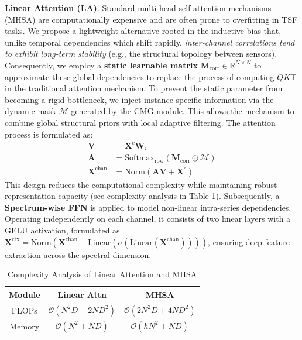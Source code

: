 \documentclass[final,3p,times]{elsarticle}
\begin{document}
\textbf{Linear Attention (LA)}. Standard multi-head self-attention mechanisms (MHSA) are computationally expensive and are often prone to overfitting in TSF tasks. We propose a lightweight alternative rooted in the inductive bias that, unlike temporal dependencies which shift rapidly, \textit{inter-channel correlations tend to exhibit long-term stability} (e.g., the structural topology between sensors). Consequently, we employ a \textbf{static learnable matrix} $\mathbf{M}_{\text{corr}} \in \mathbb{R}^{N \times N}$ to approximate these global dependencies to replace the process of computing $QK\top$ in the traditional attention mechanism.
To prevent the static parameter from becoming a rigid bottleneck, we inject instance-specific information via the dynamic mask $\mathcal{M}$ generated by the CMG module. This allows the mechanism to combine global structural priors with local adaptive filtering. The attention process is formulated as:
\begin{equation}
\begin{aligned}
    \mathbf{V} &= \mathbf{X}^c \mathbf{W}_v \\
    \mathbf{A} &= \text{Softmax}_{\text{row}}(\mathbf{M}_{\text{corr}} \odot \mathcal{M}) \\
    \mathbf{X}^{\text{chan}} &= \text{Norm}(\mathbf{A} \mathbf{V} + \mathbf{X}^c)
\end{aligned}
\end{equation}
This design reduces the computational complexity while maintaining robust representation capacity (see complexity analysis in Table \ref{table:compl}). 
Subsequently, a \textbf{Spectrum-wise FFN} is applied to model non-linear intra-series dependencies. Operating independently on each channel, it consists of two linear layers with a GELU activation, formulated as $\mathbf{X}^{\text{ctx}} = \text{Norm}(\mathbf{X}^{\text{chan}} + \text{Linear}(\sigma(\text{Linear}(\mathbf{X}^{\text{chan}}))))$, ensuring deep feature extraction across the spectral dimension.

\begin{table}[!t]\small
\centering
\caption{Complexity Analysis of Linear Attention and MHSA}
\begin{tabular}{c c c}
    \toprule
    Module & Linear Attn & MHSA \\
    \midrule
    FLOPs   & $\mathcal{O}(N^2D+2ND^2)$ & $\mathcal{O}(2N^2D+4ND^2)$   \\
    Memory  & $\mathcal{O}(N^2+ND)$ & $\mathcal{O}(hN^2+ND)$  \\
    \bottomrule
\end{tabular}
\label{table:compl} 
\end{table}
\end{document}
